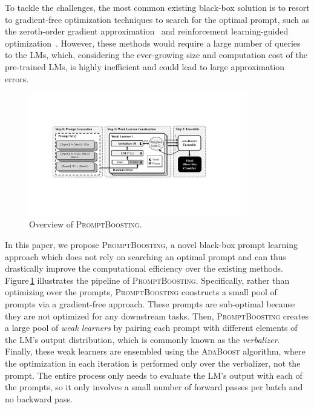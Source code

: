 \documentclass{article}
\theoremstyle{plain}
\theoremstyle{definition}
\theoremstyle{remark}
\newcommand{\alg}{\textsc{PromptBoosting}}
\begin{document}
To tackle the challenges, the most common existing black-box solution is to resort to gradient-free optimization techniques to search for the optimal prompt, such as the zeroth-order gradient approximation~\citep{sun2022bbt, diao2022black} and reinforcement learning-guided optimization~\citep{deng2022rlprompt}. However, these methods would require a large number of queries to the LMs, which, considering the ever-growing size and computation cost of the pre-trained LMs, is highly inefficient and could lead to large approximation errors.
\begin{figure}
    \centering
    \includegraphics[width=0.85\textwidth]{figure/overview.pdf}
    \vspace{-1mm}
    \caption{Overview of {\alg}.}
    \label{fig:overview}
\end{figure}

In this paper, we propose \alg, a novel black-box prompt learning approach which does not rely on searching an optimal prompt and can thus drastically improve the computational efficiency over the existing methods. Figure\,\ref{fig:overview} illustrates the pipeline of {\alg}.  Specifically, rather than optimizing over the prompts, {\alg} constructs a small pool of prompts via a gradient-free approach. These prompts are sub-optimal because they are not optimized for any downstream tasks. Then, {\alg} creates a large pool of \emph{weak learners} by pairing each prompt with different elements of the LM's output distribution, which is commonly known as the \emph{verbalizer}. Finally, these weak learners are ensembled using the \textsc{AdaBoost} algorithm, where the optimization in each iteration is performed only over the verbalizer, not the prompt. The entire process only needs to evaluate the LM's output with each of the prompts, so it only involves a small number of forward passes per batch and no backward pass.
\end{document}
